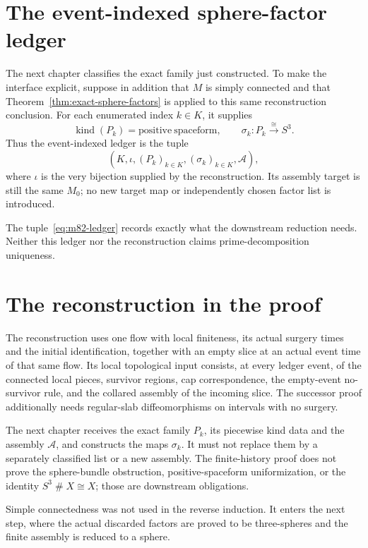 \section{The event-indexed sphere-factor ledger}
\label{sec:m82-factor-ledger}

The next chapter classifies the exact family just constructed.  To make the
interface explicit, suppose in addition that $M$ is simply connected and that
Theorem~\ref{thm:exact-sphere-factors} is applied to this same reconstruction conclusion.
For each enumerated index $k\in K$, it supplies
\[
  \operatorname{kind}(P_k)=\mathrm{positive\ spaceform},
  \qquad \sigma_k:P_k\xrightarrow{\cong}S^3.
\]
Thus the event-indexed ledger is the tuple
\begin{equation}
  (K,\iota,(P_k)_{k\in K},(\sigma_k)_{k\in K},\mathscr A),
  \label{eq:m82-ledger}
\end{equation}
where $\iota$ is the very bijection supplied by the reconstruction.  Its
assembly target is still the same $M_0$; no new target map or independently
chosen factor list is introduced.

The tuple~\eqref{eq:m82-ledger} records exactly what the
downstream reduction needs.  Neither this ledger nor the reconstruction claims
prime-decomposition uniqueness.

\section{The reconstruction in the proof}
\label{sec:finite-history-contracts}

The reconstruction uses one flow with local finiteness, its
actual surgery times and the initial identification, together with
an empty slice at an actual event time of that same flow.  Its local
topological input consists, at every ledger event, of the
connected local pieces, survivor regions, cap correspondence, the empty-event
no-survivor rule, and the collared assembly of the incoming slice.  The
successor proof additionally needs regular-slab diffeomorphisms on intervals
with no surgery.

The next chapter receives the exact family $P_k$, its piecewise
kind data and the assembly $\mathscr A$, and constructs the maps $\sigma_k$.
It must not
replace them by a separately classified list or a new assembly.  The finite-history proof
does not prove the sphere-bundle obstruction, positive-spaceform uniformization,
or the identity $S^3\mathbin{\#}X\cong X$; those are downstream obligations.

Simple connectedness was not used in the reverse induction.  It enters
the next step, where the actual discarded factors are proved to be
three-spheres and the finite assembly is reduced to a sphere.
